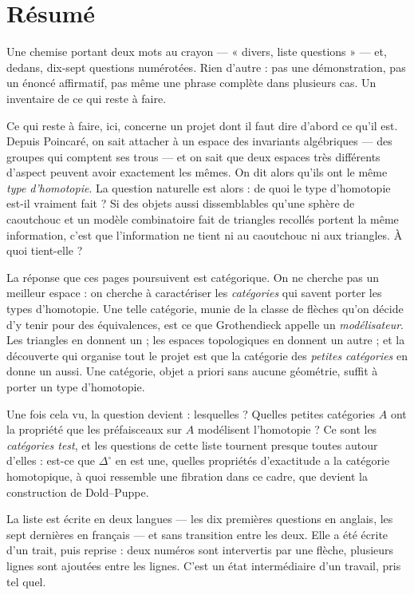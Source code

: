 \documentclass[11pt,a4paper]{article}
\begin{document}
\section*{Résumé}

\begin{resume}
Une chemise portant deux mots au crayon --- « divers, liste questions » --- et,
dedans, dix-sept questions numérotées. Rien d'autre : pas une démonstration,
pas un énoncé affirmatif, pas même une phrase complète dans plusieurs cas. Un
inventaire de ce qui reste à faire.

Ce qui reste à faire, ici, concerne un projet dont il faut dire d'abord ce
qu'il est. Depuis Poincaré, on sait attacher à un espace des invariants
algébriques --- des groupes qui comptent ses trous --- et on sait que deux
espaces très différents d'aspect peuvent avoir exactement les mêmes. On dit
alors qu'ils ont le même \emph{type d'homotopie}. La question naturelle est
alors : de quoi le type d'homotopie est-il vraiment fait ? Si des objets aussi
dissemblables qu'une sphère de caoutchouc et un modèle combinatoire fait de
triangles recollés portent la même information, c'est que l'information ne
tient ni au caoutchouc ni aux triangles. À quoi tient-elle ?

La réponse que ces pages poursuivent est catégorique. On ne cherche pas un
meilleur espace : on cherche à caractériser les \emph{catégories} qui savent
porter les types d'homotopie. Une telle catégorie, munie de la classe de
flèches qu'on décide d'y tenir pour des équivalences, est ce que Grothendieck
appelle un \emph{modélisateur}. Les triangles en donnent un ; les espaces
topologiques en donnent un autre ; et la découverte qui organise tout le projet
est que la catégorie des \emph{petites catégories} en donne un aussi. Une
catégorie, objet a priori sans aucune géométrie, suffit à porter un type
d'homotopie.

Une fois cela vu, la question devient : lesquelles ? Quelles petites catégories
$A$ ont la propriété que les préfaisceaux sur $A$ modélisent l'homotopie ? Ce
sont les \emph{catégories test}, et les questions de cette liste tournent
presque toutes autour d'elles : est-ce que $\Delta^{\circ}$ en est une, quelles
propriétés d'exactitude a la catégorie homotopique, à quoi ressemble une
fibration dans ce cadre, que devient la construction de Dold--Puppe.

La liste est écrite en deux langues --- les dix premières questions en anglais,
les sept dernières en français --- et sans transition entre les deux. Elle a
été écrite d'un trait, puis reprise : deux numéros sont intervertis par une
flèche, plusieurs lignes sont ajoutées entre les lignes. C'est un état
intermédiaire d'un travail, pris tel quel.

\end{resume}
\end{document}
